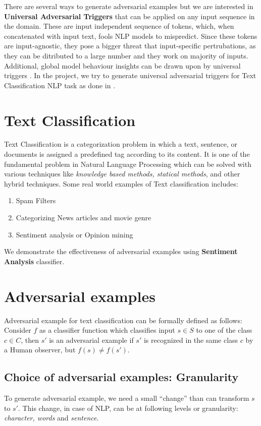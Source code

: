 \documentclass[12pt]{report}
\begin{document}
\begin{spacing}{1.5}
There are several ways to generate adversarial examples but we are interested in \textbf{Universal Adversarial Triggers} that can be applied on any input sequence in the domain.
These are input independent sequence of tokens, which, when concatenated with input text, fools NLP models to mispredict. Since these tokens are input-agnostic, they pose a bigger threat that input-specific pertrubations, as they can be ditributed to a large number and they work on majority of inputs. Additional, global model behaviour insights can be drawn upon by universal triggers \cite{wallace2019}. In the project, we try to generate universal adversarial triggers for Text Classification NLP task as done in \cite{wallace2019, behjati2019}.

\section{Text Classification}
Text Classification is a categorization problem in which a text, sentence, or documents is assigned a predefined tag according to its content. It is one of the fundamental problem in Natural Language Processing which can be solved with various techniques like \textit{knowledge based methods, statical methods}, and other hybrid techniques.
Some real world examples of Text classification includes:
\begin{enumerate}
\item Spam Filters
\item Categorizing News articles and movie genre
\item Sentiment analysis or Opinion mining
\end{enumerate}
We demonstrate the effectiveness of adversarial examples using \textbf{Sentiment Analysis} classifier.

\section{Adversarial examples}

Adversarial example for text classification can be formally defined as follows:
Consider $f$ as a classifier function which classifies input $s \in S$ to one of the class $c \in C$, then $s'$ is an adversarial example if $s'$ is recognized in the same class $c$ by a Human observer, but $f(s) \neq f(s')$.

\subsection{Choice of adversarial examples: Granularity}
To generate adversarial example, we need a small ``change'' than can transform $s$ to $s'$. This change, in case of NLP, can be at following levels or granularity: \textit{character, words} and \textit{ sentence}.

\end{spacing}
\end{document}

